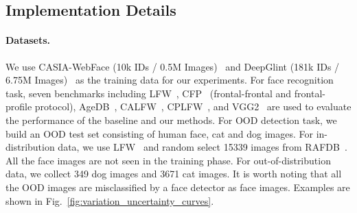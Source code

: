 \documentclass[letterpaper]{article} %
\begin{document}
\subsection{Implementation Details}
\label{ssec:details}


\paragraph{Datasets.}
We use CASIA-WebFace (10k IDs / 0.5M Images)~\cite{yi2014learning} and DeepGlint (181k IDs / 6.75M Images)~\cite{deepglint} as the training data for our experiments. For face recognition task, seven benchmarks including LFW~\cite{huang2008labeled}, CFP~\cite{sengupta2016frontal} (frontal-frontal and frontal-profile protocol), AgeDB~\cite{moschoglou2017agedb}, CALFW~\cite{zheng2017cross}, CPLFW~\cite{zheng2018cross}, and VGG2~\cite{cao2018vggface2} are used to evaluate the performance of the baseline and our methods. For OOD detection task, we build an OOD test set consisting of human face, cat and dog images. For in-distribution data, we use LFW~\cite{huang2008labeled} and random select 15339 images from RAFDB~\cite{li2017reliable}. All the face images are not seen in the training phase. For out-of-distribution data, we collect 349 dog images and 3671 cat images. It is worth noting that all the OOD images are misclassified by a face detector as face images. Examples are shown in Fig.~\ref{fig:variation_uncertainty_curves}.
\end{document}
